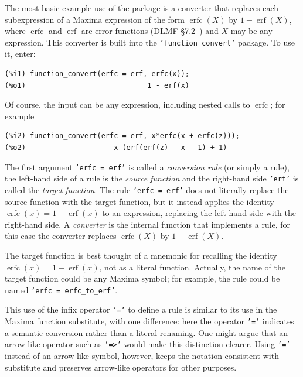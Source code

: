 \documentclass[12pt,fleqn]{extarticle}
\newcommand{\ttq}[1]{\texttt{'#1'}}
\newcommand{\funconvert}{\ttq{function\_convert}{ }}
\newenvironment{maximabox}
  {\begin{tcolorbox}[
      breakable,
      enhanced,
      colback=white,
      colframe=black!8,
      boxrule=0pt,
      borderline west={2.2pt}{0pt}{black!25},
      arc=1pt,
      left=11pt,
      right=7pt,
      top=9pt,
      bottom=9pt,
      before skip=14pt,
      after skip=14pt
    ]}
  {\end{tcolorbox}}
\DeclareMathOperator{\erf}{erf}
\DeclareMathOperator{\erfc}{erfc}
\begin{document}
The most basic example use of the package is a converter that replaces each subexpression of a Maxima expression of the form  $\erfc(X)$  by $1 - \erf(X)$, where  $\erfc$ and  $\erf$ are error functions (DLMF \S 7.2~\cite{DLMF}) and 
$X$ may be any expression. This converter is built into the \funconvert package. To use it, enter:
\begin{maximabox}
\begin{verbatim}
(%i1) function_convert(erfc = erf, erfc(x));
(%o1)                             1 - erf(x)
\end{verbatim}
\end{maximabox} 
\noindent  Of course, the input can be any expression, including nested calls to $\erfc$; for 
example
\begin{maximabox}
\begin{verbatim}
(%i2) function_convert(erfc = erf, x*erfc(x + erfc(z)));
(%o2)                     x (erf(erf(z) - x - 1) + 1)
\end{verbatim}
\end{maximabox} 
The first argument \ttq{erfc = erf} is called a \emph{conversion rule} (or simply a rule), 
the left-hand side of a rule is the \emph{source function} and the right-hand side \ttq{erf} is called the
\emph{target function}. The rule \ttq{erfc = erf} does not literally
replace the source function with the target function, but it instead applies the 
identity $\erfc(x) = 1 - \erf(x)$ to an expression, replacing the left-hand side with 
the right-hand side.  A \emph{converter} is the internal function that implements a rule,
for this case the converter replaces $\erfc(X)$  by $1 - \erf(X)$.

The target function is best thought of a mnemonic for recalling 
the identity $\erfc(x) = 1 - \erf(x)$, not as a literal function. Actually, the name of the 
target function could be any Maxima symbol; for example, the rule could be named 
\ttq{erfc = erfc\_to\_erf}.

This use of the infix operator \ttq{=} to define a rule is similar to its use in the Maxima function substitute, with one difference: here the operator \ttq{=}  indicates a semantic conversion rather than a literal renaming. One might argue that an arrow-like operator such as \ttq{=>} would make this distinction clearer. Using \ttq{=}   instead of an arrow-like symbol, however, keeps the notation consistent with substitute and preserves arrow-like operators for other purposes.
\end{document}
